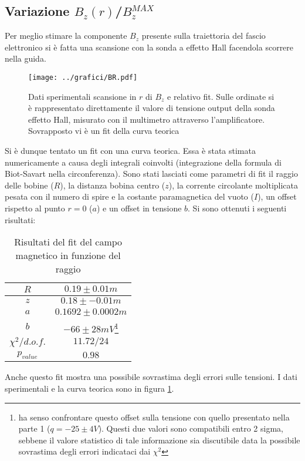 \documentclass[10pt,a4paper]{article}
\begin{document}
\subsection{Variazione $B_z(r)$/$B_z^{MAX}$}

Per meglio stimare la componente $B_z$ presente sulla traiettoria del fascio elettronico si è fatta una scansione con la sonda a effetto Hall facendola scorrere nella guida. 

\begin{figure}[h!]
	\centering
	\texttt{[image: ../grafici/BR.pdf]}
	\caption{Dati sperimentali scansione in $r$ di $B_z$ e relativo fit. Sulle ordinate si è rappresentato direttamente il valore di tensione output della sonda effetto Hall, misurato con il multimetro attraverso l'amplificatore. Sovrapposto vi è un fit della curva teorica}
	\label{BR}
\end{figure}

Si è dunque tentato un fit con una curva teorica. Essa è stata stimata numericamente a causa degli integrali coinvolti (integrazione della formula di Biot-Savart nella circonferenza). Sono stati lasciati come parametri di fit il raggio delle bobine ($R$), la distanza bobina centro ($z$), la corrente circolante moltiplicata pesata con il numero di spire e la costante paramagnetica del vuoto ($I$), un offset rispetto al punto $r=0$ ($a$) e un offset in tensione $b$. Si sono ottenuti i seguenti risultati:

\begin{table}[H]
	\centering
	\begin{tabular}{c|c}
		$R$ & $0.19\pm 0.01 m$\\
		\hline
		$z$ & $0.18\pm-0.01 m$ \\
		\hline
		$a$ & $0.1692 \pm 0.0002 m$\\ 
		\hline
		$b$ & $-66 \pm 28 mV$\footnote{ha senso confrontare questo offset sulla tensione con quello presentato nella parte 1 ($q=-25\pm 4 V$). Questi due valori sono compatibili entro 2 sigma, sebbene il valore statistico di tale informazione sia discutibile data la possibile sovrastima degli errori indicataci dai $\chi^2$}\\
		\hline
		$\chi^2/d.o.f.$ & $11.72 / 24$\\
		\hline
		$p_{value}$ & $0.98$\\
		\end{tabular}
	\caption{Risultati del fit del campo magnetico in funzione del raggio}
	\label{tab:BrBmax}
\end{table}

Anche questo fit mostra una possibile sovrastima degli errori sulle tensioni. I dati sperimentali e la curva teorica sono in figura \ref{BR}.
\end{document}
